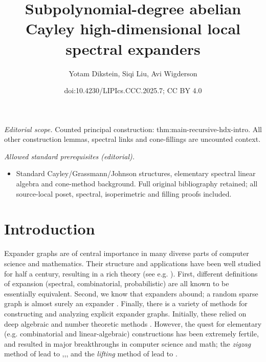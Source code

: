 \documentclass[10pt,a4paper]{article}
\title{Subpolynomial-degree abelian Cayley high-dimensional local spectral expanders}
\author{Yotam Dikstein, Siqi Liu, Avi Wigderson}
\date{doi:10.4230/LIPIcs.CCC.2025.7; CC BY 4.0}
\theoremstyle{definition}
\theoremstyle{remark}
\numberwithin{equation}{section}
\begin{document}
\maketitle
\noindent\textit{Editorial scope.} Counted principal construction: thm:main-recursive-hdx-intro. All other construction lemmas, spectral links and cone-fillings are uncounted context.\par\medskip
\noindent\textit{Allowed standard prerequisites (editorial).}\begin{itemize}
\item Standard Cayley/Grassmann/Johnson structures, elementary spectral linear algebra and cone-method background. Full original bibliography retained; all source-local poset, spectral, isoperimetric and filling proofs included.
\end{itemize}\medskip
{}
\setcounter{page}{1}
\section{Introduction}
Expander graphs are of central importance in many diverse parts of computer science and mathematics. Their structure and applications have been well studied for half a century, resulting in a rich theory (see e.g. \cite{hoory2006expander,lubotzky2012expander}). First, different definitions of expansion (spectral, combinatorial, probabilistic) are all known to be essentially equivalent. Second, we know that expanders abound; a random sparse graph is almost surely an expander \cite{pinsker1973complexity}. Finally, there is a variety of methods for constructing and analyzing explicit expander graphs. Initially, these relied on deep algebraic and number theoretic methods \cite{margulis1973explicit,gabber1981explicit,lubotzky1988ramanujan}. However, the quest for elementary (e.g. combinatorial and linear-algebraic) constructions has been extremely fertile, and resulted in major breakthroughs in computer science and math; the \emph{zigzag} method of \cite{reingold2000entropy} lead to \cite{dinur2007pcp},\cite{Reingold2008},\cite{TaShma2017explicit}, and the \emph{lifting} method of \cite{bilu2004constructing} lead to \cite{marcus2015interlacing,MarkusSS2015}.
\end{document}
